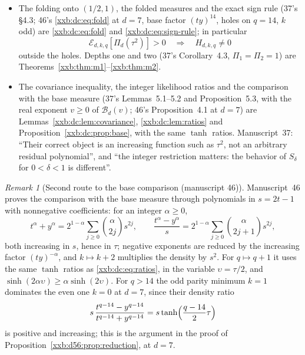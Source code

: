 \documentclass[11pt,a4paper]{article}
\numberwithin{equation}{section}
\theoremstyle{definition}
\theoremstyle{remark}
\newtheorem{remark}[theorem]{Remark}
\theoremstyle{plain}
\begin{document}
\begin{itemize}[leftmargin=1.4em,itemsep=1pt]
 may be ignored''.
\item The folding onto $(1/2,1)$, the folded measures and the exact sign rule
 (37's \S4.3; 46's \eqref{xxb:dc:eq:fold} at $d=7$, base factor
 $(ty)^{14}$, holes on $q=14$, $k$ odd) are \eqref{xxb:dc:eq:fold} and
 \eqref{xxb:dc:eq:sign-rule}; in particular
\begin{equation}\label{xxb:d78:eq:criterion}
 \mathcal E_{d,k,q}[\Pi_d(\tau^2)]>0\quad\Longrightarrow\quad H_{d,k,q}\ne0
\end{equation}
 outside the holes.  Depths one and two (37's Corollary~4.3, $\Pi_1=\Pi_2=1$)
 are Theorems~\ref{xxb:thm:m1}--\ref{xxb:thm:m2}.
\item The covariance inequality, the integer likelihood ratios and the
 comparison with the base measure (37's Lemmas~5.1--5.2 and
 Proposition~5.3, with the real exponent $v\ge0$ of $\mathcal B_d(v)$; 46's
 Proposition~4.1 at $d=7$) are Lemmas~\ref{xxb:dc:lem:covariance},
 \ref{xxb:dc:lem:ratios} and Proposition~\ref{xxb:dc:prop:base}, with the same
 $\tanh$ ratios.  Manuscript~37: ``Their correct object is an increasing
 function such as $\tau^2$, not an arbitrary residual polynomial'', and ``the
 integer restriction matters: the behavior of $S_\delta$ for $0<\delta<1$ is
 different''.
\end{itemize}

\begin{remark}[Second route to the base comparison (manuscript 46)]\label{xxb:d7:rem:ratios}
Manuscript~46 proves the comparison with the base measure through
polynomials in $s=2t-1$ with nonnegative coefficients: for an integer
$\alpha\ge0$,
\[
 t^\alpha+y^\alpha=2^{1-\alpha}\sum_{j\ge0}\binom{\alpha}{2j}s^{2j},\qquad
 \frac{t^\alpha-y^\alpha}{s}=2^{1-\alpha}\sum_{j\ge0}\binom{\alpha}{2j+1}s^{2j},
\]
both increasing in $s$, hence in $\tau$; negative exponents are reduced by the
increasing factor $(ty)^{-\alpha}$, and $k\mapsto k+2$ multiplies the density
by $s^2$.  For $q\mapsto q+1$ it uses the same $\tanh$ ratios as
\eqref{xxb:dc:eq:ratios}, in the variable $\upsilon=\tau/2$, and
$\sinh(2\alpha\upsilon)\ge\alpha\sinh(2\upsilon)$.  For $q>14$ the odd parity
minimum $k=1$ dominates the even one $k=0$ at $d=7$, since their density
ratio
\begin{equation}\label{xxb:d7:eq:parity-minimum}
 s\,\frac{t^{q-14}-y^{q-14}}{t^{q-14}+y^{q-14}}=s\tanh\Bigl(\frac{q-14}{2}\tau\Bigr)
\end{equation}
is positive and increasing; this is the argument in the proof of
Proposition~\ref{xxb:d56:prop:reduction}, at $d=7$.
\end{remark}
\end{document}
